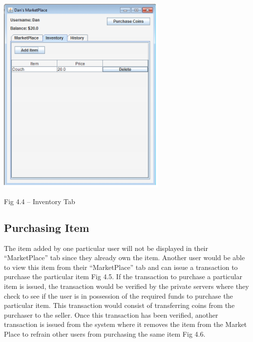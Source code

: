 \documentclass{article} %
\begin{document}
\noindent \begin{center}
\includegraphics*[bb=0 0 3.28in 3.93in, width=3.28in, height=3.93in, keepaspectratio=false]{image4.png}

\noindent Fig 4.4 -- Inventory Tab
\end{center}

\noindent \begin{flushleft}

\end{flushleft}

\noindent 
\subsection{Purchasing Item}

\begin{flushleft}
The item added by one particular user will not be displayed in their ``MarketPlace'' tab since they already own the item. Another user would be able to view this item from their ``MarketPlace'' tab and can issue a transaction to purchase the particular item Fig 4.5. If the transaction to purchase a particular item is issued, the transaction would be verified by the private servers where they check to see if the user is in possession of the required funds to purchase the particular item. This transaction would consist of transferring coins from the purchaser to the seller. Once this transaction has been verified, another transaction is issued from the system where it removes the item from the Market Place to refrain other users from purchasing the same item Fig 4.6.

\noindent 
\end{flushleft}
\end{document}
